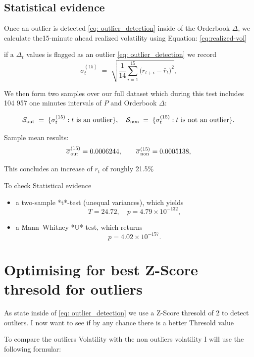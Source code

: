 \documentclass[12pt]{article}
\begin{document}
\newpage

\subsection*{\textbf{Statistical evidence}}

Once an outlier is detected \eqref{eq: outlier_detection} inside of the Orderbook $\Delta$, we calculate the15-minute ahead realized volatility using Equation: \eqref{eq:realized-vol}




if a $\Delta_t$ values is flagged as an outlier \eqref{eq: outlier_detection}
we record
$$
\sigma^{(15)}_t
\;=\;
\sqrt{\frac{1}{14}\sum_{i=1}^{15}\bigl(r_{t+i}-\bar r_{t}\bigr)^{2}},
$$

We then form two samples over our full dataset which during this test includes 104 957 one minutes intervals of $P$ and Orderbook $\Delta$:


$$
\mathcal{S}_{\rm out} \;=\;\{\sigma^{(15)}_t : t\text{ is an outlier}\},
\quad
\mathcal{S}_{\rm non} \;=\;\{\sigma^{(15)}_t : t\text{ is not an outlier}\}.
$$


Sample mean results:
$$
\overline{\sigma}^{(15)}_{\rm out}
=0.0006244,
\qquad
\overline{\sigma}^{(15)}_{\rm non}
=0.0005138,
$$




This concludes an increase of $r_t$ of roughly 21.5\%


To check Statistical evidence

\begin{itemize}
  \item a two-sample *t*-test (unequal variances), which yields
  $$
    T=24.72,\quad p=4.79\times10^{-132},
  $$
  \item a Mann–Whitney *U*-test, which returns
  $$
    p=4.02\times10^{-157}.
  $$
\end{itemize}


\newpage

\section*{Optimising for best Z-Score thresold for outliers}

As state inside of \eqref{eq: outlier_detection} we use a Z-Score thresold of 2 to detect outliers. I now want to 
see if by any chance there is a better Thresold value  

To compare the outliers Volatility with the non outliers volatility I will use the following formular:
\end{document}
